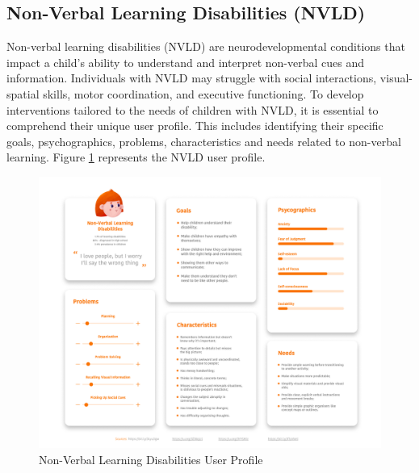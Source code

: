 \subsection{Non-Verbal Learning Disabilities (NVLD)}
Non-verbal learning disabilities (NVLD) are neurodevelopmental conditions that impact a child's ability to understand and interpret non-verbal cues and information. Individuals with NVLD may struggle with social interactions, visual-spatial skills, motor coordination, and executive functioning. To develop interventions tailored to the needs of children with NVLD, it is essential to comprehend their unique user profile. This includes identifying their specific goals, psychographics, problems, characteristics and needs related to non-verbal learning. Figure \ref{fig:nvldUserProfile} represents the NVLD user profile.

\begin{figure}[H]
    \centering
    \includegraphics[width=1\linewidth]{Chapters/figma/Non-Verbal Learning Disabilities.png}
    \caption{Non-Verbal Learning Disabilities User Profile}
    \label{fig:nvldUserProfile}
\end{figure}

